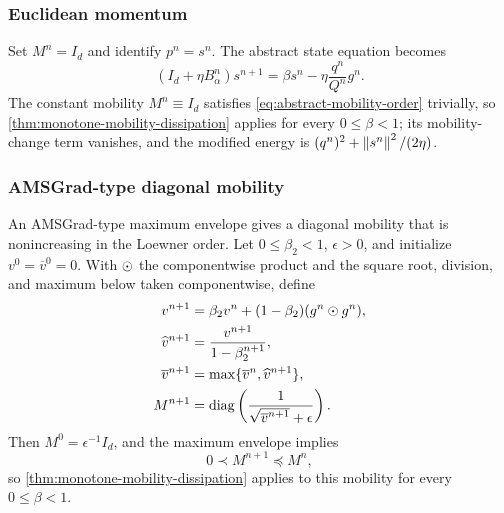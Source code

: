 \subsubsection{Euclidean momentum}

Set \(M^n=I_d\) and identify \(p^n=s^n\).  The abstract state equation becomes
\begin{equation}
  \left(I_d+\eta B_\alpha^n\right)s^{n+1}
  =\beta s^n-\eta\frac{q^n}{Q^n}g^n.
  \label{eq:euclidean-momentum-step}
\end{equation}
The constant mobility \(M^n\equiv I_d\) satisfies
\cref{eq:abstract-mobility-order} trivially, so
\cref{thm:monotone-mobility-dissipation} applies for every
\(0\leq\beta<1\); its mobility-change term vanishes, and the modified
energy is \((q^n)^2+\left\lVert s^n\right\rVert^2/(2\eta)\).

\subsubsection{AMSGrad-type diagonal mobility}

An AMSGrad-type maximum envelope \cite{reddi2018amsgrad} gives a diagonal
mobility that is nonincreasing in the Loewner order. Let \(0\leq\beta_2<1\),
\(\epsilon>0\), and initialize
\(v^0=\overline v^0=0\).  With \(\mathbin{\odot}\) the componentwise product and the
square root, division, and maximum below taken componentwise, define
\begin{subequations}
\label{eq:adaptive-second-moment}
\begin{align}
  v^{n+1}
  &=\beta_2v^n+(1-\beta_2)(g^n\mathbin{\odot} g^n),
  \label{eq:adaptive-v}\\
  \widehat v^{n+1}
  &=\frac{v^{n+1}}{1-\beta_2^{n+1}},
  \label{eq:adaptive-bias-correction}\\
  \overline v^{n+1}
  &=\max\{\overline v^n,\widehat v^{n+1}\},
  \label{eq:adaptive-max}\\
  M^{n+1}
  &=\operatorname{diag}\left(
  \frac{1}{\sqrt{\overline v^{n+1}}+\epsilon}
  \right).
  \label{eq:adaptive-mobility}
\end{align}
\end{subequations}
Then \(M^0=\epsilon^{-1}I_d\), and the maximum envelope implies
\begin{equation}
  0\prec M^{n+1}\preceq M^n,
  \label{eq:adaptive-mobility-order}
\end{equation}
so \cref{thm:monotone-mobility-dissipation} applies to this mobility for
every \(0\leq\beta<1\).

